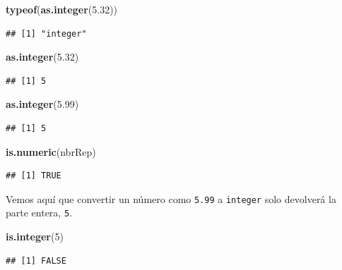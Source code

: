 \documentclass[]{book}
\newenvironment{Shaded}{\begin{snugshade}}{\end{snugshade}}
\newcommand{\KeywordTok}[1]{\textcolor[rgb]{0.13,0.29,0.53}{\textbf{#1}}}
\newcommand{\DecValTok}[1]{\textcolor[rgb]{0.00,0.00,0.81}{#1}}
\newcommand{\FloatTok}[1]{\textcolor[rgb]{0.00,0.00,0.81}{#1}}
\newcommand{\NormalTok}[1]{#1}
\begin{document}
\begin{Shaded}
\begin{Highlighting}[]
\KeywordTok{typeof}\NormalTok{(}\KeywordTok{as.integer}\NormalTok{(}\FloatTok{5.32}\NormalTok{))}
\end{Highlighting}
\end{Shaded}

\begin{verbatim}
## [1] "integer"
\end{verbatim}

\begin{Shaded}
\begin{Highlighting}[]
\KeywordTok{as.integer}\NormalTok{(}\FloatTok{5.32}\NormalTok{)}
\end{Highlighting}
\end{Shaded}

\begin{verbatim}
## [1] 5
\end{verbatim}

\begin{Shaded}
\begin{Highlighting}[]
\KeywordTok{as.integer}\NormalTok{(}\FloatTok{5.99}\NormalTok{)}
\end{Highlighting}
\end{Shaded}

\begin{verbatim}
## [1] 5
\end{verbatim}

\begin{Shaded}
\begin{Highlighting}[]
\KeywordTok{is.numeric}\NormalTok{(nbrRep)}
\end{Highlighting}
\end{Shaded}

\begin{verbatim}
## [1] TRUE
\end{verbatim}

Vemos aquí que convertir un número como \texttt{5.99} a \texttt{integer}
solo devolverá la parte entera, \texttt{5}.

\begin{Shaded}
\begin{Highlighting}[]
\KeywordTok{is.integer}\NormalTok{(}\DecValTok{5}\NormalTok{)}
\end{Highlighting}
\end{Shaded}

\begin{verbatim}
## [1] FALSE
\end{verbatim}
\end{document}
